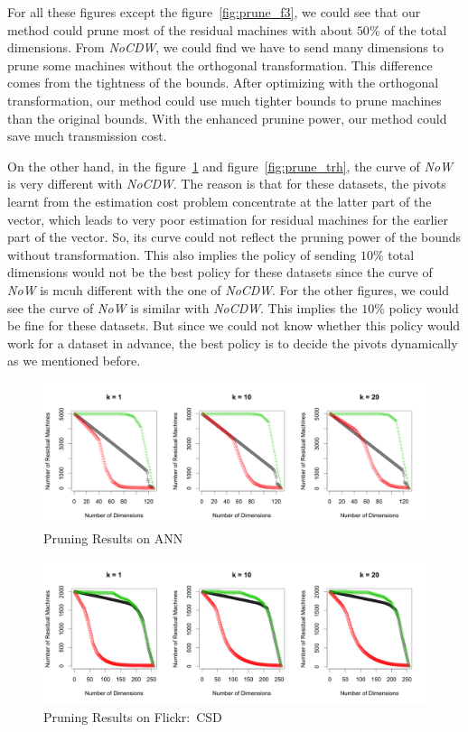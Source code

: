 For all these figures except the figure~\ref{fig:prune_f3}, we could see that our method could prune most of the residual machines with about $50\%$ of the total dimensions.  From \emph{NoCDW}, we could find we have to send many dimensions to prune some machines without the orthogonal transformation.  This difference comes from the tightness of the bounds.  After optimizing with the orthogonal transformation, our method could use much tighter bounds to prune machines than the original bounds.  With the enhanced prunine power, our method could save much transmission cost.

On the other hand, in the figure~\ref{fig:prune_ANN} and figure~\ref{fig:prune_trh}, the curve of \emph{NoW} is very different with \emph{NoCDW}.  The reason is that for these datasets, the pivots learnt from the estimation cost problem concentrate at the latter part of the vector, which leads to very poor estimation for residual machines for the earlier part of the vector.  So, its curve could not reflect the pruning power of the bounds without transformation.  This also implies the policy of sending $10\%$ total dimensions would not be the best policy for these datasets since the curve of \emph{NoW} is mcuh different with the one of \emph{NoCDW}.  For the other figures, we could see the curve of \emph{NoW} is similar with \emph{NoCDW}. This implies the $10\%$ policy would be fine for these datasets.  But since we could not know whether this policy would work for a dataset in advance, the best policy is to decide the pivots dynamically as we mentioned before.

\begin{figure}[htpb!]
  \centering
  \includegraphics[width=1.0\linewidth]{exp/prune/ANN.png}
  \caption{Pruning Results on ANN}
  \label{fig:prune_ANN}
\end{figure}

\begin{figure}[htpb!]
  \centering
  \includegraphics[width=1.0\linewidth]{exp/prune/f2.png}
  \caption{Pruning Results on Flickr:~CSD}
  \label{fig:prune_f2}
\end{figure}


